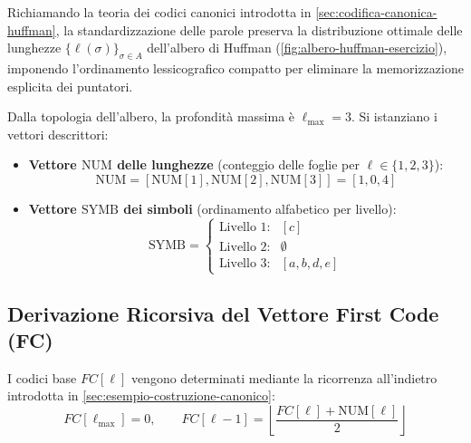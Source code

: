 Richiamando la teoria dei codici canonici introdotta in \autoref{sec:codifica-canonica-huffman}, la standardizzazione delle parole preserva la distribuzione ottimale delle lunghezze $\{\ell(\sigma)\}_{\sigma \in A}$ dell'albero di Huffman (\autoref{fig:albero-huffman-esercizio}), imponendo l'ordinamento lessicografico compatto per eliminare la memorizzazione esplicita dei puntatori.

Dalla topologia dell'albero, la profondit\`a massima \`e $\ell_{\max} = 3$. Si istanziano i vettori descrittori:
\begin{itemize}
  \item \textbf{Vettore $\text{NUM}$ delle lunghezze} (conteggio delle foglie per $\ell \in \{1, 2, 3\}$):
  \begin{equation}
    \text{NUM} = [\text{NUM}[1], \text{NUM}[2], \text{NUM}[3]] = [1, 0, 4]
  \end{equation}
  \item \textbf{Vettore $\text{SYMB}$ dei simboli} (ordinamento alfabetico per livello):
  \begin{equation}
    \text{SYMB} = 
    \begin{cases}
      \text{Livello 1}: & [c] \\
      \text{Livello 2}: & \emptyset \\
      \text{Livello 3}: & [a, b, d, e]
    \end{cases}
  \end{equation}
\end{itemize}

\FloatBarrier
\subsection{Derivazione Ricorsiva del Vettore First Code (FC)}
\label{subsec:calcolo-vettore-fc}

I codici base $FC[\ell]$ vengono determinati mediante la ricorrenza all'indietro introdotta in \autoref{sec:esempio-costruzione-canonico}:
\begin{equation}
  FC[\ell_{\max}] = 0, \qquad FC[\ell - 1] = \left\lfloor \frac{FC[\ell] + \text{NUM}[\ell]}{2} \right\rfloor
\end{equation}

